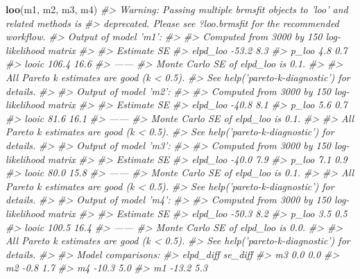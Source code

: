 \documentclass[]{book}
\newenvironment{Shaded}{\begin{snugshade}}{\end{snugshade}}
\newcommand{\CommentTok}[1]{\textcolor[rgb]{0.56,0.35,0.01}{\textit{#1}}}
\newcommand{\KeywordTok}[1]{\textcolor[rgb]{0.13,0.29,0.53}{\textbf{#1}}}
\newcommand{\NormalTok}[1]{#1}
\begin{document}
\begin{Shaded}
\begin{Highlighting}[]
\KeywordTok{loo}\NormalTok{(m1, m2, m3, m4)}
\CommentTok{#> Warning: Passing multiple brmsfit objects to 'loo' and related methods is}
\CommentTok{#> deprecated. Please see ?loo.brmsfit for the recommended workflow.}
\CommentTok{#> Output of model 'm1':}
\CommentTok{#> }
\CommentTok{#> Computed from 3000 by 150 log-likelihood matrix}
\CommentTok{#> }
\CommentTok{#>          Estimate   SE}
\CommentTok{#> elpd_loo    -53.2  8.3}
\CommentTok{#> p_loo         4.8  0.7}
\CommentTok{#> looic       106.4 16.6}
\CommentTok{#> ------}
\CommentTok{#> Monte Carlo SE of elpd_loo is 0.1.}
\CommentTok{#> }
\CommentTok{#> All Pareto k estimates are good (k < 0.5).}
\CommentTok{#> See help('pareto-k-diagnostic') for details.}
\CommentTok{#> }
\CommentTok{#> Output of model 'm2':}
\CommentTok{#> }
\CommentTok{#> Computed from 3000 by 150 log-likelihood matrix}
\CommentTok{#> }
\CommentTok{#>          Estimate   SE}
\CommentTok{#> elpd_loo    -40.8  8.1}
\CommentTok{#> p_loo         5.6  0.7}
\CommentTok{#> looic        81.6 16.1}
\CommentTok{#> ------}
\CommentTok{#> Monte Carlo SE of elpd_loo is 0.1.}
\CommentTok{#> }
\CommentTok{#> All Pareto k estimates are good (k < 0.5).}
\CommentTok{#> See help('pareto-k-diagnostic') for details.}
\CommentTok{#> }
\CommentTok{#> Output of model 'm3':}
\CommentTok{#> }
\CommentTok{#> Computed from 3000 by 150 log-likelihood matrix}
\CommentTok{#> }
\CommentTok{#>          Estimate   SE}
\CommentTok{#> elpd_loo    -40.0  7.9}
\CommentTok{#> p_loo         7.1  0.9}
\CommentTok{#> looic        80.0 15.8}
\CommentTok{#> ------}
\CommentTok{#> Monte Carlo SE of elpd_loo is 0.1.}
\CommentTok{#> }
\CommentTok{#> All Pareto k estimates are good (k < 0.5).}
\CommentTok{#> See help('pareto-k-diagnostic') for details.}
\CommentTok{#> }
\CommentTok{#> Output of model 'm4':}
\CommentTok{#> }
\CommentTok{#> Computed from 3000 by 150 log-likelihood matrix}
\CommentTok{#> }
\CommentTok{#>          Estimate   SE}
\CommentTok{#> elpd_loo    -50.3  8.2}
\CommentTok{#> p_loo         3.5  0.5}
\CommentTok{#> looic       100.5 16.4}
\CommentTok{#> ------}
\CommentTok{#> Monte Carlo SE of elpd_loo is 0.0.}
\CommentTok{#> }
\CommentTok{#> All Pareto k estimates are good (k < 0.5).}
\CommentTok{#> See help('pareto-k-diagnostic') for details.}
\CommentTok{#> }
\CommentTok{#> Model comparisons:}
\CommentTok{#>    elpd_diff se_diff}
\CommentTok{#> m3   0.0       0.0  }
\CommentTok{#> m2  -0.8       1.7  }
\CommentTok{#> m4 -10.3       5.0  }
\CommentTok{#> m1 -13.2       5.3}
\end{Highlighting}
\end{Shaded}
\end{document}
